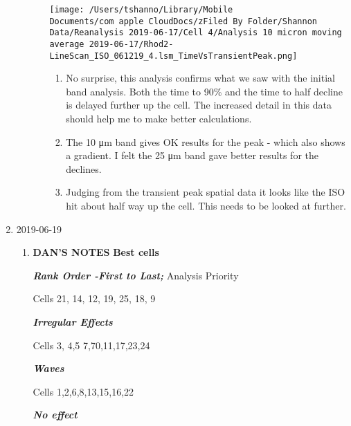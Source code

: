 \documentclass[11pt]{article}
\begin{document}
\begin{enumerate}
\begin{enumerate}
\begin{enumerate}
\begin{center}
\texttt{[image: /Users/tshanno/Library/Mobile Documents/com~apple~CloudDocs/zFiled By Folder/Shannon Data/Reanalysis 2019-06-17/Cell 4/Analysis 10 micron moving average 2019-06-17/Rhod2-LineScan\_ISO\_061219\_4.lsm\_TimeVsTransientPeak.png]}
\end{center}
\begin{enumerate}
\item No surprise, this analysis confirms what we saw with the initial band analysis.  Both the time to 90\% and the time to half decline is delayed further up the cell.  The increased detail in this data should help me to make better calculations.
\label{sec:org8cbc91b}
\item The 10 μm band gives OK results for the peak - which also shows a gradient.  I felt the 25 μm band gave better results for the declines.
\label{sec:org4e3a7f4}
\item Judging from the transient peak spatial data it looks like the ISO hit about half way up the cell.  This needs to be looked at further.
\label{sec:org56883d7}
\end{enumerate}
\end{enumerate}
\end{enumerate}
\item 2019-06-19
\label{sec:org7cf2d01}
\begin{enumerate}
\item \textbf{DAN'S NOTES}
\label{sec:org9b984bc}
\textbf{Best cells}

\textbf{\emph{Rank Order -First to Last;}} Analysis Priority

Cells 21, 14, 12, 19, 25, 18, 9

\emph{\textbf{Irregular Effects}}

Cells 3, 4,5 7,70,11,17,23,24

\emph{\textbf{Waves}}

Cells 1,2,6,8,13,15,16,22

\emph{\textbf{No effect}}


\end{enumerate}
\end{enumerate}
\end{document}

